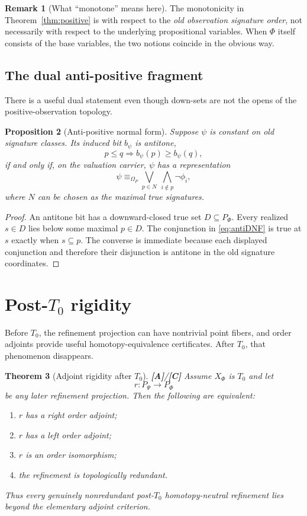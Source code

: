\documentclass[11pt]{article}
\newtheorem{theorem}{Theorem}[section]
\newtheorem{proposition}[theorem]{Proposition}
\theoremstyle{definition}
\newtheorem{remark}[theorem]{Remark}
\newcommand{\Om}{\Omega_P}
\newcommand{\statusA}{\textbf{[A]}}
\newcommand{\statusC}{\textbf{[C]}}
\begin{document}
\begin{remark}[What ``monotone'' means here]
The monotonicity in Theorem~\ref{thm:positive} is with respect to the \emph{old observation signature order}, not necessarily with respect to the underlying propositional variables. When $\Phi$ itself consists of the base variables, the two notions coincide in the obvious way.
\end{remark}

\subsection{The dual anti-positive fragment}

There is a useful dual statement even though down-sets are not the opens of the positive-observation topology.

\begin{proposition}[Anti-positive normal form]\label{prop:antipositive}
Suppose $\psi$ is constant on old signature classes. Its induced bit $b_\psi$ is antitone,
\[
p\le q\Longrightarrow b_\psi(p)\ge b_\psi(q),
\]
if and only if, on the valuation carrier, $\psi$ has a representation
\begin{equation}\label{eq:antiDNF}
\psi\equiv_{\Om}
\bigvee_{p\in N}\ \bigwedge_{i\notin p}\neg\phi_i,
\end{equation}
where $N$ can be chosen as the maximal true signatures.
\end{proposition}

\begin{proof}
An antitone bit has a downward-closed true set $D\subseteq P_\Phi$. Every realized $s\in D$ lies below some maximal $p\in D$. The conjunction in \eqref{eq:antiDNF} is true at $s$ exactly when $s\subseteq p$. The converse is immediate because each displayed conjunction and therefore their disjunction is antitone in the old signature coordinates.
\end{proof}

\section{Post-$T_0$ rigidity}

Before $T_0$, the refinement projection can have nontrivial point fibers, and order adjoints provide useful homotopy-equivalence certificates. After $T_0$, that phenomenon disappears.

\begin{theorem}[Adjoint rigidity after $T_0$]\label{thm:adjrigid}
\statusA/\statusC\;
Assume $X_\Phi$ is $T_0$ and let
\[
r:P_\Psi\to P_\Phi
\]
be any later refinement projection. Then the following are equivalent:
\begin{enumerate}[label=(\roman*)]
\item $r$ has a right order adjoint;
\item $r$ has a left order adjoint;
\item $r$ is an order isomorphism;
\item the refinement is topologically redundant.
\end{enumerate}
Thus every genuinely nonredundant post-$T_0$ homotopy-neutral refinement lies beyond the elementary adjoint criterion.
\end{theorem}
\end{document}
